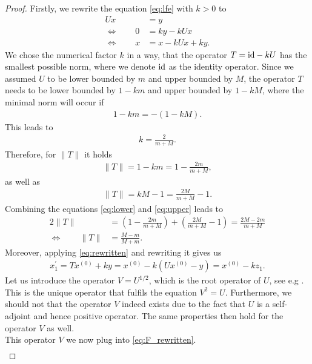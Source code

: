 \begin{proof}
Firstly, we rewrite the equation \eqref{eq:lfe} with $k>0$ to
\begin{align}\label{eq:rewritten}
Ux &= y\nonumber\\
\Longleftrightarrow \qquad 0 &= ky - kUx\nonumber\\
\Longleftrightarrow \qquad x &= x - kUx + ky.
\end{align}
We chose the numerical factor $k$ in a way, that the operator $T=\mathrm{id}-kU$ has the smallest possible norm, where we denote $\mathrm{id}$ as the identity operator. Since we assumed $U$ to be lower bounded by $m$ and upper bounded by $M$, the operator $T$ needs to be lower bounded by $1-km$ and upper bounded by $1-kM$, where the minimal norm will occur if
\begin{align*}
1-km = -(1-kM).
\end{align*}
This leads to
\begin{align*}
k = \frac{2}{m + M}.
\end{align*}
Therefore, for $\|T\|$ it holds
\begin{align}\label{eq:lower}
\|T\| = 1 - km = 1 - \frac{2m}{m+M},
\end{align}
as well as
\begin{align}\label{eq:upper}
\|T\| = kM - 1 = \frac{2M}{m+M} - 1.
\end{align}
Combining the equations \eqref{eq:lower} and \eqref{eq:upper} leads to
\begin{align*}
2\|T\| &= \left( 1 - \frac{2m}{m+M}\right) + \left( \frac{2M}{m+M} - 1\right) = \frac{2M - 2m}{m+M}\\
\Longleftrightarrow \qquad \|T\| &= \frac{M-m}{M+m}.
\end{align*}
Moreover, applying \eqref{eq:rewritten} and rewriting it gives us
\begin{align}\label{eq:x_prime}
x^{\prime}_1 = Tx^{(0)} + ky = x^{(0)} - k(Ux^{(0)} - y) = x^{(0)} - kz_1.
\end{align}
Let us introduce the operator $V = U^{1/2}$, which is the root operator of $U$, see e.g \cite[Theorem~V.6.2]{kantorovich2016functional}. This is the unique operator that fulfils the equation $V^2 = U$. Furthermore, we should not that the operator $V$ indeed exists due to the fact that $U$ is a self-adjoint and hence positive operator. The same properties then hold for the operator $V$ as well.\\
This operator $V$ we now plug into \eqref{eq:F_rewritten}.
\begin{align}\label{eq:F_rewritten2}

\end{align}
\end{proof}
